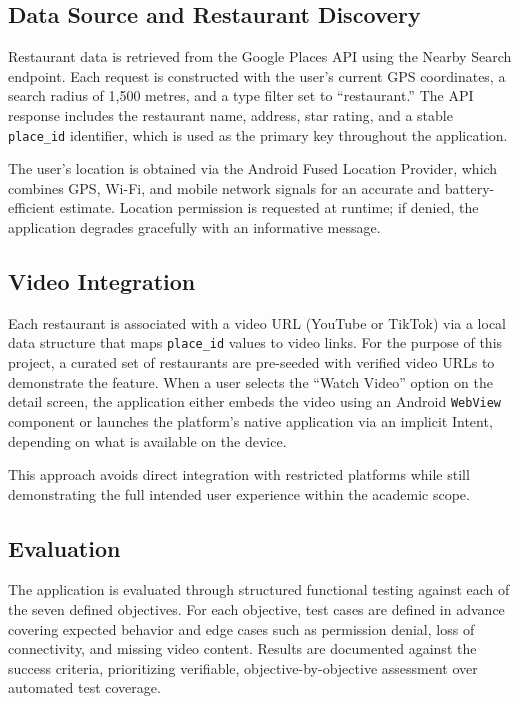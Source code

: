 \documentclass[12pt, a4paper]{article}
\begin{document}
\subsection{Data Source and Restaurant Discovery}

Restaurant data is retrieved from the Google Places API using the Nearby Search endpoint. Each request is constructed with the user's current GPS coordinates, a search radius of 1,500 metres, and a type filter set to ``restaurant.'' The API response includes the restaurant name, address, star rating, and a stable \texttt{place\_id} identifier, which is used as the primary key throughout the application.

The user's location is obtained via the Android Fused Location Provider, which combines GPS, Wi-Fi, and mobile network signals for an accurate and battery-efficient estimate. Location permission is requested at runtime; if denied, the application degrades gracefully with an informative message.

\subsection{Video Integration}

Each restaurant is associated with a video URL (YouTube or TikTok) via a local data structure that maps \texttt{place\_id} values to video links. For the purpose of this project, a curated set of restaurants are pre-seeded with verified video URLs to demonstrate the feature. When a user selects the ``Watch Video'' option on the detail screen, the application either embeds the video using an Android \texttt{WebView} component or launches the platform's native application via an implicit Intent, depending on what is available on the device.

This approach avoids direct integration with restricted platforms while still demonstrating the full intended user experience within the academic scope.

\subsection{Evaluation}

The application is evaluated through structured functional testing against each of the seven defined objectives. For each objective, test cases are defined in advance covering expected behavior and edge cases such as permission denial, loss of connectivity, and missing video content. Results are documented against the success criteria, prioritizing verifiable, objective-by-objective assessment over automated test coverage.
\end{document}
